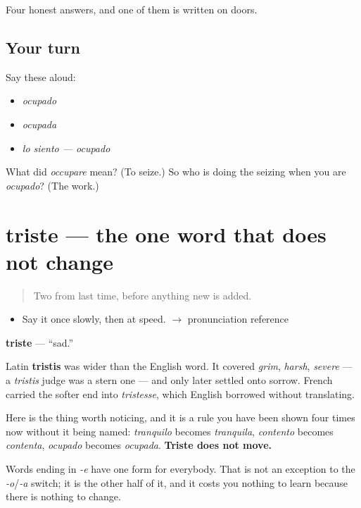 \begin{grammarlens}[title={What you've built}]
Four honest answers, and one of them is written on doors.
\end{grammarlens}

\subsection*{Your turn}
Say these aloud:

\begin{itemize}
\raggedright
  \item \emph{ocupado}
  \item \emph{ocupada}
  \item \emph{lo siento — ocupado}
\end{itemize}

\begin{tcolorbox}[breakable,colback=teal!4,colframe=teal!35!black,title={Before you move on}]
What did \emph{occupare} mean? (To seize.) So who is doing the seizing when you are \emph{ocupado}? (The work.)
\end{tcolorbox}
\section[triste]{triste — the one word that does not change}

\label{lesson:ES-C304-triste}



\begin{quote}
Two from last time, before anything new is added.
\end{quote}

\begin{sounds}
\begin{itemize}
\raggedright
  \item Say it once slowly, then at speed. $\to$ pronunciation reference
\end{itemize}
\end{sounds}

\begin{cousinweb}
\textbf{triste} — \textquotedblleft{}sad.\textquotedblright{}

Latin \textbf{tristis} was wider than the English word. It covered \emph{grim}, \emph{harsh}, \emph{severe} — a \emph{tristis} judge was a stern one — and only later settled onto sorrow. French carried the softer end into \emph{tristesse}, which English borrowed without translating.

Here is the thing worth noticing, and it is a rule you have been shown four times now without it being named: \emph{tranquilo} becomes \emph{tranquila}, \emph{contento} becomes \emph{contenta}, \emph{ocupado} becomes \emph{ocupada}. \textbf{Triste does not move.}

Words ending in \emph{-e} have one form for everybody. That is not an exception to the \emph{-o}/\emph{-a} switch; it is the other half of it, and it costs you nothing to learn because there is nothing to change.
\end{cousinweb}

